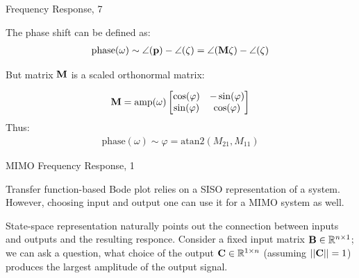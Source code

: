 \documentclass{beamer}
\begin{document}
\begin{frame}{Frequency Response, 7}
	\begin{flushleft}
		
		The phase shift can be defined as:
		\begin{align}
			\text{phase}(\omega)
			\sim 
			\angle (\mathbf{p}) - \angle (\zeta)
			=
			\angle (\mathbf{M} \zeta) - \angle (\zeta)
		\end{align}		
		
		But matrix $\mathbf{M}$ is a scaled orthonormal matrix:  
		
		\begin{align}
			\mathbf{M} = \text{amp}(\omega)
			\begin{bmatrix}
				\cos(\varphi) & -\sin(\varphi) \\
				\sin(\varphi) & \cos(\varphi)
			\end{bmatrix}
		\end{align}				
		Thus:
		\begin{align}
			\text{phase}(\omega)
			\sim 
			\varphi = \text{atan2}(M_{21}, M_{11})
		\end{align}		
		
	\end{flushleft}
\end{frame}



\begin{frame}{MIMO Frequency Response, 1}
	\begin{flushleft}
		
		Transfer function-based Bode plot relies on a SISO representation of a system. However, choosing input and output one can use it for a MIMO system as well. 
		
		\bigskip
		
		State-space representation naturally points out the connection between inputs and outputs and the resulting responce. Consider a fixed input matrix $\mathbf{B} \in \mathbb{R}^{n \times 1}$; we can ask a question, what choice of the output $\mathbf{C} \in \mathbb{R}^{1 \times n}$ (assuming $||\mathbf{C} || = 1$) produces the largest amplitude of the output signal.
		
	\end{flushleft}
\end{frame}
\end{document}
